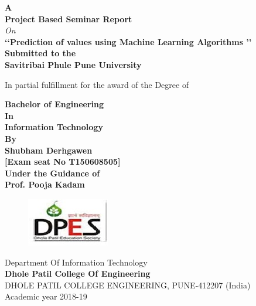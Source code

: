 \documentclass[12pt,times,a4paper]{report}
\begin{document}
\begin{titlepage}
\newpage
{}
\pagestyle{empty}

\thispagestyle{empty}
\thisfancypage{%
  \setlength{\fboxrule}{2pt}\doublebox}{}

\begin{center}
\vspace*{0.2in}
{\fontsize{18}{16} \bf {A}}\\
{\fontsize{18}{16} \bf {Project Based Seminar Report}}\\
{\fontsize{18}{16} \it {On }}\\
\vspace*{0.2in}
{\fontsize{18}{14} \bf {\lq\lq  Prediction of values using Machine Learning Algorithms \rq\rq}}\\
\vspace*{0.2in}
{\fontsize{12}{16} \bf  Submitted to the}\\
{\fontsize{12}{16} \bf Savitribai Phule Pune University
}
\begin{normalsize}
\begin{center}
In partial fulfillment for the award of the Degree of
\end{center}
\end{normalsize}

{\fontsize{14}{12} \bf  Bachelor of Engineering }\\
{\fontsize{14}{12} \bf  In}
\\{\fontsize{14}{12} \bf  Information Technology }\\
{\fontsize{12}{16} \bf   By}\\
\vspace*{0.1in}
{\fontsize{14}{12} \bf Shubham Derhgawen }\\
{\fontsize{12}{8} \bf [Exam seat No T150608505] }\\

\vspace*{0.2in}
{\fontsize{12}{16} \bf Under the Guidance of }\\
\vspace*{0.1in}
{\fontsize{14}{12} \bf Prof. Pooja Kadam}\\
\begin{figure}[h]
\centerline{\includegraphics[scale=0.8]{logo1.jpg}}
\end{figure}

{ \fontsize{14}{12}  {Department Of Information Technology}}\\
{ \fontsize{14}{12} \bf {Dhole Patil  College Of Engineering}}\\
{ \fontsize{14}{12}  {DHOLE PATIL COLLEGE ENGINEERING, PUNE-412207 (India)}}\\

Academic year 2018-19

\end{center}
\end{titlepage}
\end{document}
